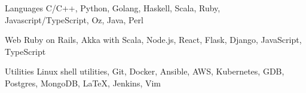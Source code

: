 

\begin{cvskills}


  \cvskill
  {Languages}
  {C/C++, Python, Golang, Haskell, Scala, Ruby, Javascript/TypeScript, Oz, Java, Perl}


  \cvskill
  {Web}
  {Ruby on Rails, Akka with Scala, Node.js, React, Flask, Django, JavaScript, TypeScript}


  \cvskill
  {Utilities}
  {Linux shell utilities, Git, Docker, Ansible, AWS, Kubernetes, GDB, Postgres, MongoDB, \LaTeX, Jenkins, Vim}




\end{cvskills}
